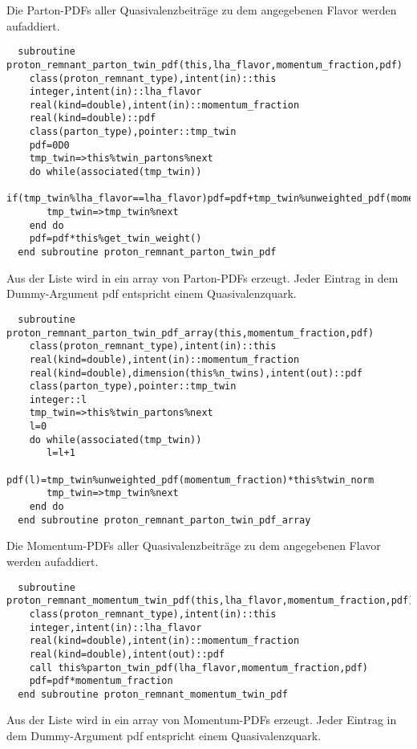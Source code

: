 Die Parton-PDFs aller Quasivalenzbeiträge zu dem angegebenen Flavor werden aufaddiert.
\begin{Verbatim}
  subroutine proton_remnant_parton_twin_pdf(this,lha_flavor,momentum_fraction,pdf)
    class(proton_remnant_type),intent(in)::this
    integer,intent(in)::lha_flavor
    real(kind=double),intent(in)::momentum_fraction
    real(kind=double)::pdf
    class(parton_type),pointer::tmp_twin
    pdf=0D0
    tmp_twin=>this%twin_partons%next
    do while(associated(tmp_twin))
       if(tmp_twin%lha_flavor==lha_flavor)pdf=pdf+tmp_twin%unweighted_pdf(momentum_fraction)
       tmp_twin=>tmp_twin%next
    end do
    pdf=pdf*this%get_twin_weight()
  end subroutine proton_remnant_parton_twin_pdf
\end{Verbatim}
Aus der Liste  wird in ein array von Parton-PDFs erzeugt. Jeder Eintrag in dem Dummy-Argument pdf entspricht einem Quasivalenzquark.
\begin{Verbatim}
  subroutine proton_remnant_parton_twin_pdf_array(this,momentum_fraction,pdf)
    class(proton_remnant_type),intent(in)::this
    real(kind=double),intent(in)::momentum_fraction
    real(kind=double),dimension(this%n_twins),intent(out)::pdf
    class(parton_type),pointer::tmp_twin
    integer::l
    tmp_twin=>this%twin_partons%next
    l=0
    do while(associated(tmp_twin))
       l=l+1
       pdf(l)=tmp_twin%unweighted_pdf(momentum_fraction)*this%twin_norm
       tmp_twin=>tmp_twin%next
    end do
  end subroutine proton_remnant_parton_twin_pdf_array
\end{Verbatim}
Die Momentum-PDFs aller Quasivalenzbeiträge zu dem angegebenen Flavor werden aufaddiert.
\begin{Verbatim}
  subroutine proton_remnant_momentum_twin_pdf(this,lha_flavor,momentum_fraction,pdf)
    class(proton_remnant_type),intent(in)::this
    integer,intent(in)::lha_flavor
    real(kind=double),intent(in)::momentum_fraction
    real(kind=double),intent(out)::pdf
    call this%parton_twin_pdf(lha_flavor,momentum_fraction,pdf)
    pdf=pdf*momentum_fraction
  end subroutine proton_remnant_momentum_twin_pdf
\end{Verbatim}
Aus der Liste  wird in ein array von Momentum-PDFs erzeugt. Jeder Eintrag in dem Dummy-Argument pdf entspricht einem Quasivalenzquark.
